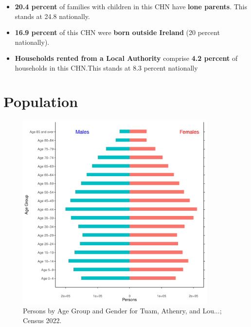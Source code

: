 \documentclass{article}
\begin{document}
\begin{itemize}
\item \textbf{20.4 percent} of families with children in this CHN have \textbf{lone parents}. This stands at 24.8 nationally.

\item \textbf{16.9 percent} of this CHN were \textbf{born outside Ireland} (20 percent nationally).

\item \textbf{Households rented from a Local Authority} comprise \textbf{4.2 percent} of households in this CHN.This stands at 8.3 percent nationally

\end{itemize}

\pagebreak

\section{Population} 
\label{sect:Pop}

\begin{figure}[h]
	\centering
	\includegraphics[width = 100mm]{../figures/PyramidPlot.pdf}
	\caption{Persons by Age Group and Gender for Tuam, Athenry, and Lou...; Census 2022.}
	\label{fig:2ae19629-1a6a-13a3-e055-000000000001}
	\end{figure}
\end{document}
